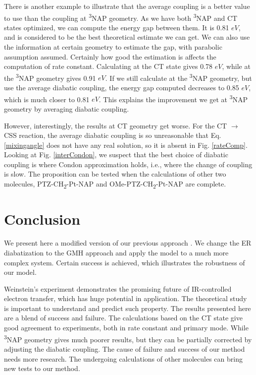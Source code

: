 There is another example to illustrate that the average coupling is a better value to use than the coupling at \textsuperscript{3}NAP geometry. As we have both \textsuperscript{3}NAP and CT states optimized, we can compute the energy gap between them. It is 0.81 $eV$, and is considered to be the best theoretical estimate we can get. We can also use the information at certain geometry to estimate the gap, with parabolic assumption assumed. Certainly how good the estimation is affects the computation of rate constant. Calculating at the CT state gives 0.78 $eV$, while at the \textsuperscript{3}NAP geometry gives 0.91 $eV$. If we still calculate at the \textsuperscript{3}NAP geometry, but use the average diabatic coupling, the energy gap computed decreases to 0.85 $eV$, which is much closer to 0.81 $eV$. This explains the improvement we get at \textsuperscript{3}NAP geometry by averaging diabatic coupling.

However, interestingly, the results at CT geometry get worse. For the CT $\rightarrow$  CSS reaction, the average diabatic coupling is so unreasonable that Eq. \ref{mixingangle} does not have any real solution, so it is absent in Fig. \ref{rateComp}. Looking at Fig. \ref{interCondon}, we suspect that the best choice of diabatic coupling is where Condon approximation holds, i.e., where the change of coupling is slow. The proposition can be tested when the calculations of other two molecules, PTZ-CH\textsubscript{2}-Pt-NAP and OMe-PTZ-CH\textsubscript{2}-Pt-NAP are complete.


\section{Conclusion} %
We present here a modified version of our previous approach \cite{yang2014intramolecular,yang2015computing}. We change the ER diabatization to the GMH approach and apply the model to a much more complex system. Certain success is achieved, which illustrates the robustness of our model.

Weinstein's experiment demonstrates the promising future of IR-controlled electron transfer, which has huge potential in application. The theoretical study is important to understand and predict such property. The results presented here are a blend of success and failure. The calculations based on the CT state give good agreement to experiments, both in rate constant and primary mode. While \textsuperscript{3}NAP geometry gives much poorer results, but they can be partially corrected by adjusting the diabatic coupling. The cause of failure and success of our method needs more research. The undergoing calculations of other molecules can bring new tests to our method.



